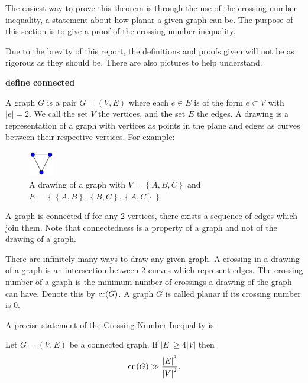 \documentclass[12pt,reqno]{amsart}
\begin{document}
The easiest way to prove this theorem is through the use of the crossing number inequality,
a statement about how planar a given graph can be. The purpose of this section is to give a proof
of the crossing number inequality.

Due to the brevity of this report, the definitions and proofs given will not be
as rigorous as they should be. There are also pictures to help understand.



\textbf{define connected}

A graph \(G\) is a pair \(G = (V,E)\) where each \(e \in E\) is of the form \(e \subset V\) with \(\left\lvert e \right\rvert = 2\).
We call the set \(V\) the vertices, and the set \(E\) the edges. A drawing is
a representation of a graph with vertices as points in the plane and edges as curves between their
respective vertices. For example:

\begin{figure}[h]
    \centering
    \includegraphics[width=0.1\textwidth]{3graph.png}
    \caption{A drawing of a graph with \(V = \left\{ A,B,C \right\}\) and \(E = \left\{ \left\{ A,B \right\} , \left\{ B,C \right\} ,\left\{ A,C \right\}  \right\} \)}
\end{figure}

A graph is connected if for any 2 vertices, there exists a sequence of edges which join them.
Note that connectedness is a property of a graph and not of the drawing of a graph.

There are infinitely many ways to draw any given graph. A crossing in a drawing
of a graph is an intersection between 2 curves which represent edges. The 
crossing number of a graph is the minimum number of crossings a drawing
of the graph can have. Denote this by
\(\operatorname{cr}(G)\). A graph \(G\) is called planar if its crossing number is 0.

A precise statement of the Crossing Number Inequality is

\begin{theorem}\label{thm:crossing-number-inequality}
    Let \(G = (V,E)\) be a connected graph. If \(\left\lvert E \right\rvert \geq 4 \left\lvert V \right\rvert \)
    then
    \[
        \operatorname{cr}\left( G \right) \gg \frac{\left\lvert E \right\rvert ^{3} }{\left\lvert V \right\rvert ^{2}}  
    .\]
\end{theorem}
\end{document}
